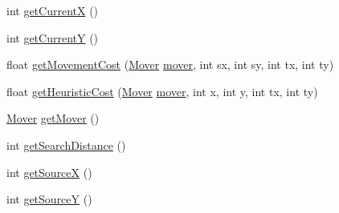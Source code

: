 \begin{DoxyCompactItemize}
int \mbox{\hyperlink{classorg_1_1newdawn_1_1slick_1_1util_1_1pathfinding_1_1_a_star_path_finder_abd096900bd63a7ee01976e75ad7950d3}{get\+CurrentX}} ()
\item 
int \mbox{\hyperlink{classorg_1_1newdawn_1_1slick_1_1util_1_1pathfinding_1_1_a_star_path_finder_a1e98b93b8c014045a831986f3de390c4}{get\+CurrentY}} ()
\item 
float \mbox{\hyperlink{classorg_1_1newdawn_1_1slick_1_1util_1_1pathfinding_1_1_a_star_path_finder_af21aa3e1c2ff9f5277e24e9ea626220c}{get\+Movement\+Cost}} (\mbox{\hyperlink{interfaceorg_1_1newdawn_1_1slick_1_1util_1_1pathfinding_1_1_mover}{Mover}} \mbox{\hyperlink{classorg_1_1newdawn_1_1slick_1_1util_1_1pathfinding_1_1_a_star_path_finder_a5407fe31e264f03e9d6092bcb18aba4a}{mover}}, int sx, int sy, int tx, int ty)
\item 
float \mbox{\hyperlink{classorg_1_1newdawn_1_1slick_1_1util_1_1pathfinding_1_1_a_star_path_finder_a15bc3df2a4e48452e9be63ac20b22303}{get\+Heuristic\+Cost}} (\mbox{\hyperlink{interfaceorg_1_1newdawn_1_1slick_1_1util_1_1pathfinding_1_1_mover}{Mover}} \mbox{\hyperlink{classorg_1_1newdawn_1_1slick_1_1util_1_1pathfinding_1_1_a_star_path_finder_a5407fe31e264f03e9d6092bcb18aba4a}{mover}}, int x, int y, int tx, int ty)
\item 
\mbox{\hyperlink{interfaceorg_1_1newdawn_1_1slick_1_1util_1_1pathfinding_1_1_mover}{Mover}} \mbox{\hyperlink{classorg_1_1newdawn_1_1slick_1_1util_1_1pathfinding_1_1_a_star_path_finder_a87eea405304f151bf2ef8621aefe4183}{get\+Mover}} ()
\item 
int \mbox{\hyperlink{classorg_1_1newdawn_1_1slick_1_1util_1_1pathfinding_1_1_a_star_path_finder_abf095f4193d79acc42fdceb293468e14}{get\+Search\+Distance}} ()
\item 
int \mbox{\hyperlink{classorg_1_1newdawn_1_1slick_1_1util_1_1pathfinding_1_1_a_star_path_finder_a170c66a9356c930fa83a50567f64be52}{get\+SourceX}} ()
\item 
int \mbox{\hyperlink{classorg_1_1newdawn_1_1slick_1_1util_1_1pathfinding_1_1_a_star_path_finder_abfd761f71fe0c43a7d3533e49cf5be33}{get\+SourceY}} ()
\end{DoxyCompactItemize}
